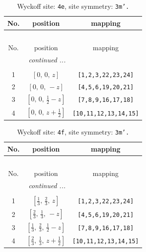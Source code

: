 \documentclass[fleqn,8pt]{jsarticle}
\begin{document}
\begin{longtable}{ccc}
\caption{Wyckoff site: {\tt 4e}, site symmetry: {\tt 3m'.}}
 \\
 \hline \hline
No. & position & mapping \\ \hline \endfirsthead

\multicolumn{2}{l}{\tablename\ \thetable{}} \\
 \hline \hline
No. & position & mapping \\ \hline \endhead

 \hline \hline
\multicolumn{2}{r}{\footnotesize\it continued ...} \\ \endfoot

 \hline \hline
\multicolumn{2}{r}{} \\ \endlastfoot

1 & $\left[ 0,\, 0,\, z \right]$ & {\tt [1,2,3,22,23,24]} \\ \hline
2 & $\left[ 0,\, 0,\, - z \right]$ & {\tt [4,5,6,19,20,21]} \\ \hline
3 & $\left[ 0,\, 0,\, \frac{1}{2} - z \right]$ & {\tt [7,8,9,16,17,18]} \\ \hline
4 & $\left[ 0,\, 0,\, z + \frac{1}{2} \right]$ & {\tt [10,11,12,13,14,15]} \\
\end{longtable}
\renewcommand{\arraystretch}{1.2}
\begin{longtable}{ccc}
\caption{Wyckoff site: {\tt 4f}, site symmetry: {\tt 3m'.}}
 \\
 \hline \hline
No. & position & mapping \\ \hline \endfirsthead

\multicolumn{2}{l}{\tablename\ \thetable{}} \\
 \hline \hline
No. & position & mapping \\ \hline \endhead

 \hline \hline
\multicolumn{2}{r}{\footnotesize\it continued ...} \\ \endfoot

 \hline \hline
\multicolumn{2}{r}{} \\ \endlastfoot

1 & $\left[ \frac{1}{3},\, \frac{2}{3},\, z \right]$ & {\tt [1,2,3,22,23,24]} \\ \hline
2 & $\left[ \frac{2}{3},\, \frac{1}{3},\, - z \right]$ & {\tt [4,5,6,19,20,21]} \\ \hline
3 & $\left[ \frac{1}{3},\, \frac{2}{3},\, \frac{1}{2} - z \right]$ & {\tt [7,8,9,16,17,18]} \\ \hline
4 & $\left[ \frac{2}{3},\, \frac{1}{3},\, z + \frac{1}{2} \right]$ & {\tt [10,11,12,13,14,15]} \\
\end{longtable}
\end{document}
